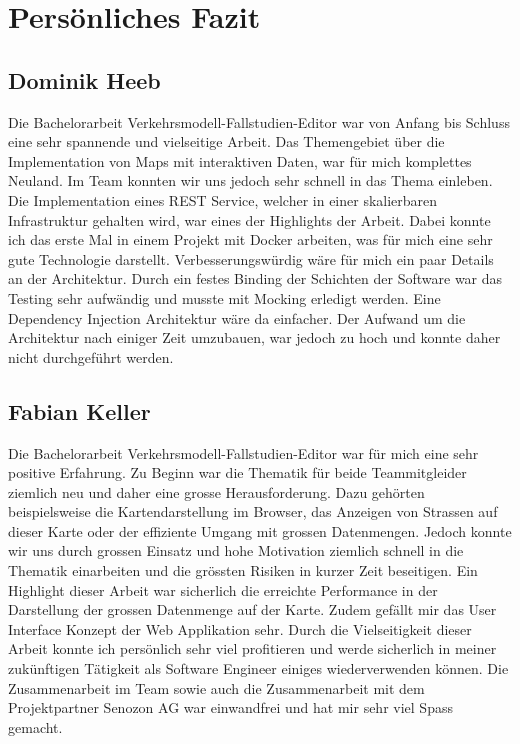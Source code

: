 \section{Persönliches Fazit}
\subsection{Dominik Heeb}
Die Bachelorarbeit Verkehrsmodell-Fallstudien-Editor war von Anfang bis Schluss eine sehr spannende und vielseitige Arbeit. Das Themengebiet über die Implementation von Maps mit interaktiven Daten, war für mich komplettes Neuland. Im Team konnten wir uns jedoch sehr schnell in das Thema einleben. Die Implementation eines REST Service, welcher in einer skalierbaren Infrastruktur gehalten wird, war eines der Highlights der Arbeit. Dabei konnte ich das erste Mal in einem Projekt mit Docker arbeiten, was für mich eine sehr gute Technologie darstellt. Verbesserungswürdig wäre für mich ein paar Details an der Architektur. Durch ein festes Binding der Schichten der Software war das Testing sehr aufwändig und musste mit Mocking erledigt werden. Eine Dependency Injection Architektur wäre da einfacher. Der Aufwand um die Architektur nach einiger Zeit umzubauen, war jedoch zu hoch und konnte daher nicht durchgeführt werden.
\subsection{Fabian Keller}
Die Bachelorarbeit \glqq{}Verkehrsmodell-Fallstudien-Editor\grqq{} war für mich eine sehr positive Erfahrung. Zu Beginn war die Thematik für beide Teammitgleider ziemlich neu und daher eine grosse Herausforderung. Dazu gehörten beispielsweise die Kartendarstellung im Browser, das Anzeigen von Strassen auf dieser Karte oder der effiziente Umgang mit grossen Datenmengen. Jedoch konnte wir uns durch grossen Einsatz und hohe Motivation ziemlich schnell in die Thematik einarbeiten und die grössten Risiken in kurzer Zeit beseitigen. Ein Highlight dieser Arbeit war sicherlich die erreichte Performance in der Darstellung der grossen Datenmenge auf der Karte. Zudem gefällt mir das User Interface Konzept der Web Applikation sehr. Durch die Vielseitigkeit dieser Arbeit konnte ich persönlich sehr viel profitieren und werde sicherlich in meiner zukünftigen Tätigkeit als Software Engineer einiges wiederverwenden können. Die Zusammenarbeit im Team sowie auch die Zusammenarbeit mit dem Projektpartner Senozon AG war einwandfrei und hat mir sehr viel Spass gemacht.